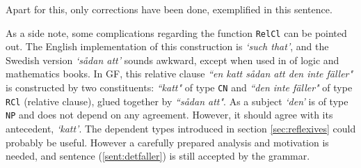 \documentclass{report}
\begin{document}
Apart for this, only corrections have been done, exemplified in
this sentence.

%
As a side note, some complications regarding the function \verb-RelCl- can
be pointed out.
The English implementation of this construction is \emph{`such that'},
and the Swedish version \emph{`sådan att'} sounds awkward, except when used in of
logic and mathematics books.
In GF, this relative clause \emph{``en katt sådan att den inte fäller"} is constructed by
two constituents: \emph{``katt"}
of type \verb-CN- and \emph{``den inte fäller"} of type \verb-RCl- (relative clause), glued
together by \emph{``sådan att"}.
As a subject \emph{`den'} is of type \verb-NP- and does not depend on any
agreement. However, it should agree with its antecedent, \emph{`katt'}. 
 \label{sent:detfaller}
The dependent types introduced in section \ref{sec:reflexives} could probably be
useful.
However a carefully prepared analysis and motivation is needed, %
and sentence (\ref{sent:detfaller}) is still accepted by the grammar.
\end{document}
